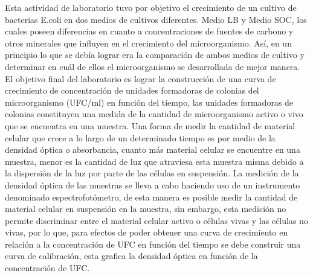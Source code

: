 Esta actividad de laboratorio tuvo por objetivo el crecimiento de un cultivo de bacterias E.coli en dos medios de cultivos diferentes. Medio LB y Medio SOC, los cuales poseen diferencias en cuanto a concentraciones de fuentes de carbono y otros minerales que influyen en el crecimiento del microorganismo. Así, en un principio lo que se debía lograr era la comparación de ambos medios de cultivo y determinar en cuál de ellos el microorganismo se desarrollada de mejor manera. El objetivo final del laboratorio es lograr la construcción de una curva de crecimiento de concentración de unidades formadoras de colonias del microorganismo (UFC/ml) en función del tiempo, las unidades formadoras de colonias constituyen una medida de la cantidad de microorganismo activo o vivo que se encuentra en una muestra. Una forma de medir la cantidad de material celular que crece a lo largo de un determinado tiempo es por medio de la densidad óptica o absorbancia, cuanto más material celular se encuentre en una muestra, menor es la cantidad de luz que atraviesa esta muestra misma debido a la dispersión de la luz por parte de las células en suspensión. La medición de la densidad óptica de las muestras se lleva a cabo haciendo uso de un instrumento denominado espectrofotómetro, de esta manera es posible medir la cantidad de material celular en suspensión en la muestra, sin embargo, esta medición no permite discriminar entre el material celular activo o células vivas y las células no vivas, por lo que, para efectos de poder obtener una curva de crecimiento en relación a la concentración de UFC en función del tiempo se debe construir una curva de calibración, esta grafica la densidad óptica en función de la concentración de UFC.
